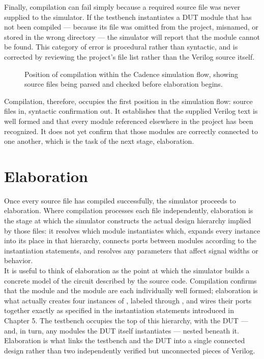 Finally, compilation can fail simply because a required source file was never supplied to the simulator. If the testbench instantiates a DUT module that has not been compiled --- because its file was omitted from the project, misnamed, or stored in the wrong directory --- the simulator will report that the module cannot be found. This category of error is procedural rather than syntactic, and is corrected by reviewing the project's file list rather than the Verilog source itself.\\


\begin{figure}[h]
\centering
\caption{Position of compilation within the Cadence simulation flow, showing source files being parsed and checked before elaboration begins.}
\label{fig:compilation_workflow}
\end{figure}

Compilation, therefore, occupies the first position in the simulation flow: source files in, syntactic confirmation out. It establishes that the supplied Verilog text is well formed and that every module referenced elsewhere in the project has been recognized. It does not yet confirm that those modules are correctly connected to one another, which is the task of the next stage, elaboration.\\

\section{Elaboration}

Once every source file has compiled successfully, the simulator proceeds to elaboration. Where compilation processes each file independently, elaboration is the stage at which the simulator constructs the actual design hierarchy implied by those files: it resolves which module instantiates which, expands every instance into its place in that hierarchy, connects ports between modules according to the instantiation statements, and resolves any parameters that affect signal widths or behavior.\\

It is useful to think of elaboration as the point at which the simulator builds a concrete model of the circuit described by the source code. Compilation confirms that the  module and the  module are each individually well formed; elaboration is what actually creates four instances of , labeled  through , and wires their ports together exactly as specified in the instantiation statements introduced in Chapter 5. The testbench occupies the top of this hierarchy, with the DUT --- and, in turn, any modules the DUT itself instantiates --- nested beneath it. Elaboration is what links the testbench and the DUT into a single connected design rather than two independently verified but unconnected pieces of Verilog.

